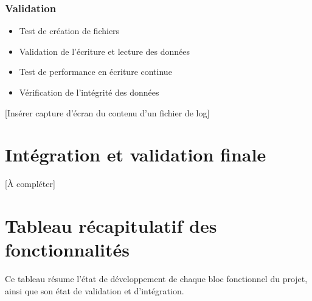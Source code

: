 \documentclass[12pt]{article}
\begin{document}
\subsubsection{Validation}
\begin{itemize}
    \item Test de création de fichiers
    \item Validation de l'écriture et lecture des données
    \item Test de performance en écriture continue
    \item Vérification de l'intégrité des données
\end{itemize}

[Insérer capture d'écran du contenu d'un fichier de log]


\section{Intégration et validation finale}
[À compléter]

\section{Tableau récapitulatif des fonctionnalités}

Ce tableau résume l'état de développement de chaque bloc fonctionnel du projet, ainsi que son état de validation et d'intégration.
\end{document}
